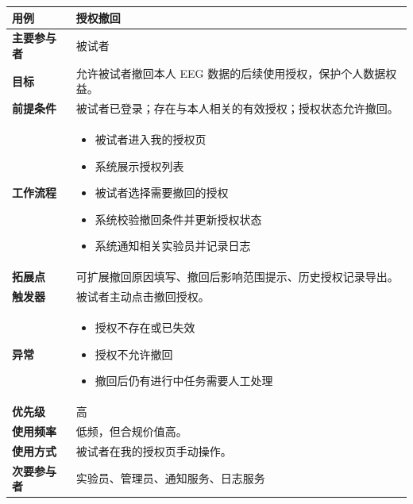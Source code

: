 \begin{table}[H]
    \centering
    \begin{tabular}{|p{3cm}|p{11.5cm}|}
        \hline
        \textbf{用例} & 授权撤回 \\
        \hline
        \textbf{主要参与者} & 被试者 \\
        \hline
        \textbf{目标} & 允许被试者撤回本人 EEG 数据的后续使用授权，保护个人数据权益。 \\
        \hline
        \textbf{前提条件} & 被试者已登录；存在与本人相关的有效授权；授权状态允许撤回。 \\
        \hline
        \textbf{工作流程} &
        \vspace{-0.3cm}
        \begin{itemize}
            \item 被试者进入我的授权页
            \item 系统展示授权列表
            \item 被试者选择需要撤回的授权
            \item 系统校验撤回条件并更新授权状态
            \item 系统通知相关实验员并记录日志
        \end{itemize} \vspace{-0.3cm} \\
        \hline
        \textbf{拓展点} & 可扩展撤回原因填写、撤回后影响范围提示、历史授权记录导出。 \\
        \hline
        \textbf{触发器} & 被试者主动点击撤回授权。 \\
        \hline
        \textbf{异常} &
        \vspace{-0.3cm}
        \begin{itemize}
            \item 授权不存在或已失效
            \item 授权不允许撤回
            \item 撤回后仍有进行中任务需要人工处理
        \end{itemize} \vspace{-0.3cm} \\
        \hline
        \textbf{优先级} & 高 \\
        \hline
        \textbf{使用频率} & 低频，但合规价值高。 \\
        \hline
        \textbf{使用方式} & 被试者在我的授权页手动操作。 \\
        \hline
        \textbf{次要参与者} & 实验员、管理员、通知服务、日志服务 \\
        \hline
    \end{tabular}
\end{table}

